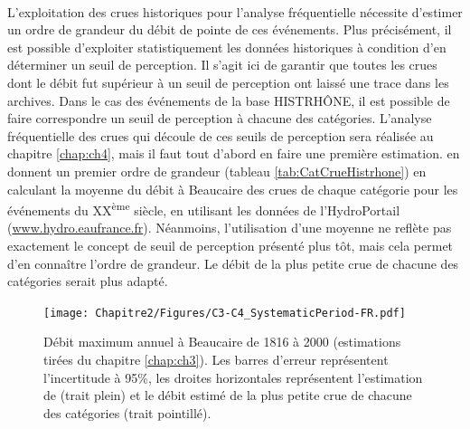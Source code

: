 	\paragraph{} L'exploitation des crues historiques pour l'analyse fréquentielle nécessite d'estimer un ordre de grandeur du débit de pointe de ces événements. Plus précisément, il est possible d'exploiter statistiquement les données historiques à condition d'en déterminer un seuil de perception. Il s'agit ici de garantir que toutes les crues dont le débit fut supérieur à un seuil de perception ont laissé une trace dans les archives. Dans le cas des événements de la base HISTRHÔNE, il est possible de faire correspondre un seuil de perception à chacune des catégories. L'analyse fréquentielle des crues qui découle de ces seuils de perception sera réalisée au chapitre \ref{chap:ch4}, mais il faut tout d'abord en faire une première estimation. \citet{pichard_hydro-climatology_2017} en donnent un premier ordre de grandeur (tableau \ref{tab:CatCrueHistrhone}) en calculant la moyenne du débit à Beaucaire des crues de chaque catégorie pour les événements du XX\textsuperscript{ème} siècle, en utilisant les données de l'HydroPortail (\url{www.hydro.eaufrance.fr}). Néanmoins, l'utilisation d'une moyenne ne reflète pas exactement le concept de seuil de perception présenté plus tôt, mais cela permet d'en connaître l'ordre de grandeur. Le débit de la plus petite crue de chacune des catégories serait plus adapté. 
	
	\begin{figure}[h]
	\centering
		\texttt{[image: Chapitre2/Figures/C3-C4\_SystematicPeriod-FR.pdf]}
        \caption{Débit maximum annuel à Beaucaire de 1816 à 2000 (estimations tirées du chapitre \ref{chap:ch3}). Les barres d'erreur représentent l'incertitude à 95\%, les droites horizontales représentent l'estimation de \citet{pichard_hydro-climatology_2017} (trait plein) et le débit estimé de la plus petite crue de chacune des catégories (trait pointillé).}
		\label{fig:C3-C4_Syst}
	\end{figure}
		
	
